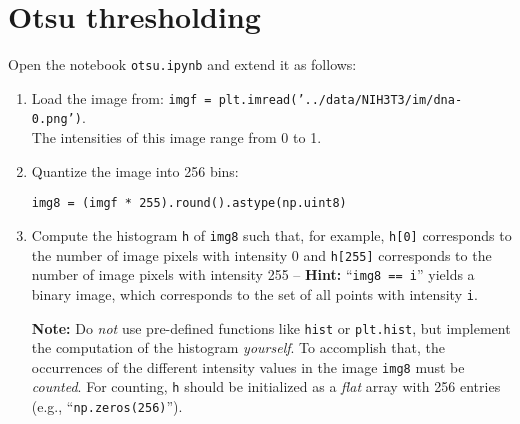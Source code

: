 \documentclass[12pt,a4paper]{article}
\begin{document}
\section{Otsu thresholding}
\label{task:otsu}

Open the notebook \texttt{otsu.ipynb} and extend it as follows:

\begin{enumerate}
    \item Load the image from: \texttt{imgf = plt.imread('../data/NIH3T3/im/dna-0.png')}.\\ The intensities of this image range from 0 to 1.
    \item Quantize the image into 256 bins:
\begin{Verbatim}[frame=single]
img8 = (imgf * 255).round().astype(np.uint8)
\end{Verbatim}
    \item Compute the histogram \texttt{h} of \texttt{img8} such that, for example, \texttt{h[0]} corresponds to the number of image pixels with intensity 0 and \texttt{h[255]} corresponds to the number of image pixels with intensity 255 -- \textbf{Hint:} ``\texttt{img8 == i}'' yields a binary image, which corresponds to the set of all points with intensity \texttt{i}.
    
    \textbf{Note:} Do \emph{not} use pre-defined functions like \texttt{hist} or \texttt{plt.hist}, but implement the computation of the histogram \emph{yourself}. To accomplish that, the occurrences of the different intensity values in the image \texttt{img8} must be \emph{counted}. For counting, \texttt{h} should be initialized as a \emph{flat} array with 256 entries (e.g., ``\texttt{np.zeros(256)}'').
    

\end{enumerate}
\end{document}
